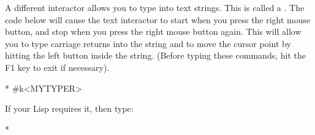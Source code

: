 A different interactor allows you to type into text strings.  This is called a
.  The code below will cause the text interactor to start
when you press the right mouse button, and stop when you press the right mouse
button again.  This will allow you to type carriage returns into the string
and to move the cursor point by hitting the left button inside the string.
(Before typing these commands, hit the F1 key to exit  
if necessary).
\begin{programexample}
* 
\#k<MYTYPER>
\end{programexample}
If your Lisp requires it, then type:
\begin{programexample}
* 
\end{programexample}

